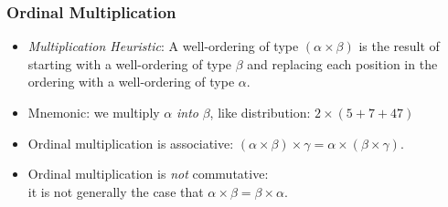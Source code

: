 \begin{frame}
\frametitle{Ordinal Multiplication}

\begin{itemize}[<+->]

\item \emph{Multiplication Heuristic}: A well-ordering of type $(\alpha\times\beta)$ is the result of starting with a well-ordering of type $\beta$ and replacing each position in the ordering with a well-ordering of type $\alpha$.

\item Mnemonic: we multiply $\alpha$ \textit{into} $\beta$, like distribution: $2 \times (5+7+47)$

\item Ordinal multiplication is associative: \((\alpha\times\beta)\times\gamma = \alpha\times(\beta\times\gamma)\).

\item Ordinal multiplication is \emph{not} commutative: \\ it is not generally the case that $\alpha \times \beta = \beta \times \alpha$.

\end{itemize}
\end{frame}


